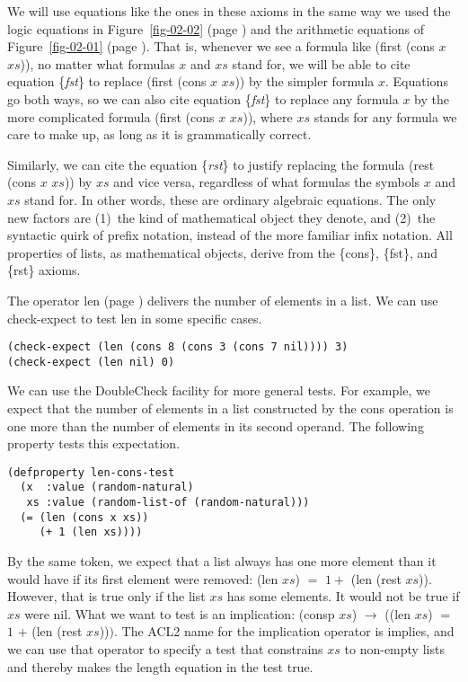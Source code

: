 We will use equations like the ones in these axioms in the
same way we used the logic equations in Figure~\ref{fig-02-02}
(page \pageref{fig-02-02}) and the arithmetic equations of
Figure~\ref{fig-02-01} (page \pageref{fig-02-01}).
That is, whenever we see a formula like \textsf{(first (cons $x$ $xs$))},
no matter what formulas $x$ and $xs$ stand for,
we will be able to cite equation \{\emph{fst}\} to replace
\textsf{(first (cons $x$ $xs$))} by the simpler formula $x$.
Equations go both ways, so we can also cite equation \{\emph{fst}\}
to replace any formula $x$ by the more complicated formula
\textsf{(first (cons $x$ $xs$))}, where $xs$ stands for any formula
we care to make up, as long as it is grammatically correct.

Similarly, we can cite the equation \{\emph{rst}\} to justify
replacing the formula \textsf{(rest (cons $x$ $xs$))} by $xs$
and vice versa, regardless of what formulas the symbols $x$ and $xs$ stand for.
In other words, these are ordinary algebraic equations.
The only new factors are
(1)~the kind of mathematical object they denote, and
(2)~the syntactic quirk of prefix notation, instead of the more familiar infix notation.
All properties of lists,
as mathematical objects,
derive from the \{cons\}, \{fst\}, and \{rst\} axioms.

The operator \textsf{len} (page \pageref{len-op-informal})
delivers the number of elements in a list.
We can use \textsf{check-expect} to test \textsf{len} in some specific cases.

\begin{Verbatim}
(check-expect (len (cons 8 (cons 3 (cons 7 nil)))) 3)
(check-expect (len nil) 0)
\end{Verbatim}

We can use the DoubleCheck facility for more general tests.
For example, we expect that the number of elements
in a list constructed by the \textsf{cons} operation is
one more than the number of elements in its second operand.
The following property tests this expectation.

\begin{Verbatim}
(defproperty len-cons-test
  (x  :value (random-natural)
   xs :value (random-list-of (random-natural)))
  (= (len (cons x xs))
     (+ 1 (len xs))))
\end{Verbatim}

By the same token, we expect that a list always
has one more element than it would have if
its first element were removed: \textsf{(len $xs$)} $=$ $1 +$ \textsf{(len (rest $xs$))}.
However, that is true only if the list $xs$
has some elements. It would not be true if $xs$ were \textsf{nil}.
What we want to test is an implication:
\textsf{(consp $xs$)} $\rightarrow$ (\textsf{(len $xs$)} $=$ $1$ $+$ \textsf{(len (rest $xs$))}$)$.
The ACL2 name for the implication operator is \textsf{implies},
and we can use that operator to specify a test that
constrains $xs$ to non-empty lists and thereby
makes the length equation in the test true.

